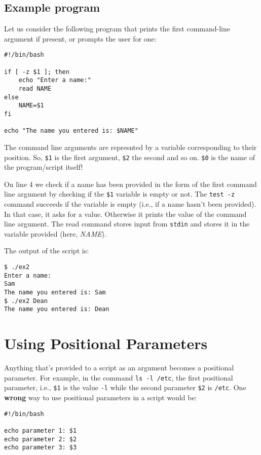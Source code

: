 \subsection{Example program}
Let us consider the following program that prints the first command-line argument if present, or prompts the user for one:

\vspace{-15pt}
\begin{verbatim}
#!/bin/bash

if [ -z $1 ]; then
	echo "Enter a name:"
	read NAME
else
	NAME=$1
fi

echo "The name you entered is: $NAME"
\end{verbatim}
\vspace{-10pt}	

\noindent
The command line arguments are represnted by a variable corresponding to their position. So, \verb|$1| is the first argument, \verb|$2| the second and so on. \verb|$0| is the name of the program/script itself!

On line 4 we check if a name has been provided in the form of the first command line argument by checking if the \verb|$1| variable is empty or not. The \verb|test -z| command succeeds if the variable is empty (i.e., if a name hasn't been provided). In that case, it asks for a value. Otherwise it prints the value of the command line argument. The read command stores input from \verb|stdin| and stores it in the variable provided (here, \textit{NAME}). 

The output of the script is:

\vspace{-15pt}
\begin{verbatim}
$ ./ex2
Enter a name:
Sam
The name you entered is: Sam
$ ./ex2 Dean
The name you entered is: Dean
\end{verbatim}
\vspace{-10pt}

\section{Using Positional Parameters}
Anything that's provided to a script as an argument becomes a positional parameter. For example, in the command \verb|ls -l /etc|, the first positional parameter, i.e., \verb|$1| is the value \verb|-l| while the second parameter \verb|$2| is \verb|/etc|. One \textbf{wrong} way to use positional parameters in a script would be:

\vspace{-15pt}
\begin{verbatim}
#!/bin/bash

echo parameter 1: $1
echo parameter 2: $2
echo parameter 3: $3
\end{verbatim}
\vspace{-10pt}	

